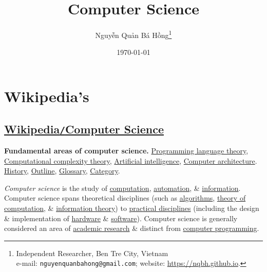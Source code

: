 \documentclass[oneside]{book}
\title{Computer Science}
\author{\selectlanguage{vietnamese} Nguyễn Quản Bá Hồng\footnote{Independent Researcher, Ben Tre City, Vietnam\\e-mail: \texttt{nguyenquanbahong@gmail.com}; website: \url{https://nqbh.github.io}.}}
\date{\today}
\numberwithin{equation}{section}
\begin{document}
\maketitle
\tableofcontents
\setcounter{secnumdepth}{4}
\setcounter{tocdepth}{4}


\chapter{Wikipedia's}

\section{\href{https://en.wikipedia.org/wiki/Computer_science}{Wikipedia\texttt{/}Computer Science}}
\textsf{\textbf{Fundamental areas of computer science.} \href{https://en.wikipedia.org/wiki/Programming_language_theory}{Programming language theory}, \href{https://en.wikipedia.org/wiki/Computational_complexity_theory}{Computational complexity theory}, \href{https://en.wikipedia.org/wiki/Artificial_intelligence}{Artificial intelligence}, \href{https://en.wikipedia.org/wiki/Computer_architecture}{Computer architecture}.} \href{https://en.wikipedia.org/wiki/History_of_computer_science}{History}, \href{https://en.wikipedia.org/wiki/Outline_of_computer_science}{Outline}, \href{https://en.wikipedia.org/wiki/Glossary_of_computer_science}{Glossary}, \href{https://en.wikipedia.org/wiki/Category:Computer_science}{Category}.

\textit{Computer science} is the study of \href{https://en.wikipedia.org/wiki/Computation}{computation}, \href{https://en.wikipedia.org/wiki/Automation}{automation}, \& \href{https://en.wikipedia.org/wiki/Information}{information}. Computer science spans theoretical disciplines (such as \href{https://en.wikipedia.org/wiki/Algorithm}{algorithms}, \href{https://en.wikipedia.org/wiki/Theory_of_computation}{theory of computation}, \& \href{https://en.wikipedia.org/wiki/Information_theory}{information theory}) to \href{https://en.wikipedia.org/wiki/Applied_science}{practical disciplines} (including the design \& implementation of \href{https://en.wikipedia.org/wiki/Computer_architecture}{hardware} \& \href{https://en.wikipedia.org/wiki/Computer_programming}{software}). Computer science is generally considered an area of \href{https://en.wikipedia.org/wiki/Research}{academic research} \& distinct from \href{https://en.wikipedia.org/wiki/Computer_programming}{computer programming}. 
\end{document}
